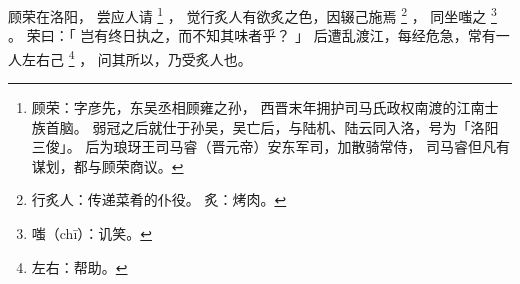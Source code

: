 
\switchcolumn*[\section{}]

顾荣在洛阳，
尝应人请%
\footnote{%
    顾荣：字彦先，东吴丞相顾雍之孙，
          西晋末年拥护司马氏政权南渡的江南士族首脑。
          弱冠之后就仕于孙吴，吴亡后，与陆机、陆云同入洛，号为「洛阳三俊」。
          后为琅玡王司马睿（晋元帝）安东军司，加散骑常侍，
          司马睿但凡有谋划，都与顾荣商议。
}%
，
觉行炙人有欲炙之色，因辍己施焉%
\footnote{%
    行炙人：传递菜肴的仆役。
    炙：烤肉。
}%
，
同坐嗤之%
\footnote{%
    嗤（chī）：讥笑。
}%
。
荣曰：「
    岂有终日执之，而不知其味者乎？
」
后遭乱渡江，每经危急，常有一人左右己%
\footnote{%
    左右：帮助。
}%
，
问其所以，乃受炙人也。

\switchcolumn


